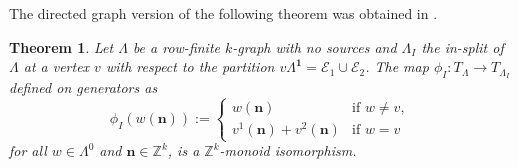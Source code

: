 \documentclass[12pt]{amsart}
\newcommand{\N}{\mathbf{n}}
\newtheorem{thm}{Theorem}[section]
\theoremstyle{definition}
\theoremstyle{remark}
\begin{document}
The directed graph version of the following theorem was obtained in \cite[Theorem 4.7]{Cordeiro}.
\begin{thm}\label{th in-splitting preserves talented monoid}
Let $\Lambda$ be a row-finite $k$-graph with no sources and $\Lambda_I$ the in-split of $\Lambda$ at a vertex $v$ with respect to the partition $v\Lambda^\mathbf{1}=\mathcal{E}_1\cup \mathcal{E}_2$. The map $\phi_I: T_\Lambda \longrightarrow T_{\Lambda_I}$ defined on generators as
$$\phi_I(w(\N)):=
	\left\{
	\begin{array}{ll}
		w(\N)  & \mbox{if } w\neq v, \\
		v^1(\N)+v^2(\N)  & \mbox{if } w=v
	\end{array}
	\right.$$ 
for all $w\in \Lambda^0$ and $\N\in \mathbb{Z}^k$, is a $\mathbb{Z}^k$-monoid isomorphism. 
\end{thm}
\end{document}
